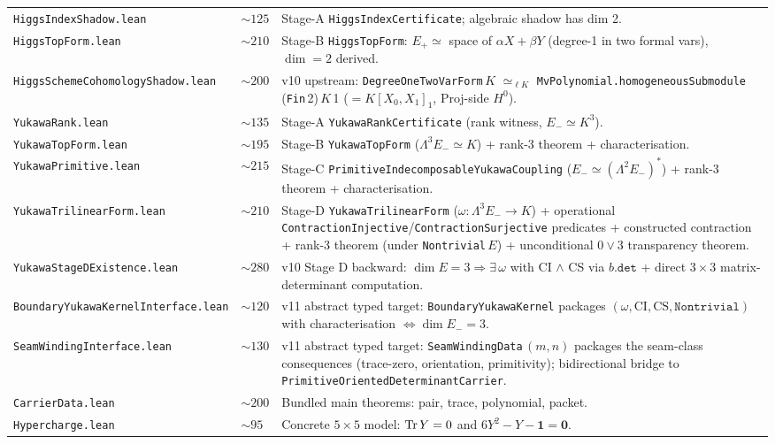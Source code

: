 \documentclass[11pt,a4paper]{article}
\begin{document}
\begin{center}
\begin{tabularx}{0.98\textwidth}{@{}p{}p{}Y@{}}
\texttt{HiggsIndexShadow.lean}    & $\sim125$ & Stage-A \texttt{HiggsIndexCertificate}; algebraic shadow has dim 2. \\
\texttt{HiggsTopForm.lean}        & $\sim210$ & Stage-B \texttt{HiggsTopForm}: $E_+ \simeq$ space of $\alpha X + \beta Y$ (degree-1 in two formal vars), $\dim = 2$ derived. \\
\texttt{HiggsSchemeCohomologyShadow.lean} & $\sim200$ & v10 upstream: \texttt{DegreeOneTwoVarForm}\,$K$ $\simeq_{\ell K}$ \texttt{MvPolynomial.homogeneousSubmodule}\,(\texttt{Fin}\,2)\,$K$\,1 ($= K[X_0, X_1]_1$, Proj-side $H^0$). \\
\texttt{YukawaRank.lean}          & $\sim135$ & Stage-A \texttt{YukawaRankCertificate} (rank witness, $E_- \simeq K^3$). \\
\texttt{YukawaTopForm.lean}       & $\sim195$ & Stage-B \texttt{YukawaTopForm} ($\Lambda^3 E_- \simeq K$) + rank-3 theorem + characterisation. \\
\texttt{YukawaPrimitive.lean}     & $\sim215$ & Stage-C \texttt{PrimitiveIndecomposableYukawaCoupling} ($E_- \simeq (\Lambda^2 E_-)^*$) + rank-3 theorem + characterisation. \\
\texttt{YukawaTrilinearForm.lean} & $\sim210$ & Stage-D \texttt{YukawaTrilinearForm} ($\omega : \Lambda^3 E_- \to K$) + operational \texttt{ContractionInjective}/\texttt{ContractionSurjective} predicates + constructed contraction + rank-3 theorem (under \texttt{Nontrivial}\,$E$) + unconditional $0\lor3$ transparency theorem. \\
\texttt{YukawaStageDExistence.lean}& $\sim280$ & v10 Stage D backward: $\dim E = 3 \Rightarrow \exists\,\omega$ with CI $\wedge$ CS via $b.\texttt{det}$ + direct $3\times 3$ matrix-determinant computation. \\
\texttt{BoundaryYukawaKernelInterface.lean}& $\sim120$ & v11 abstract typed target: \texttt{BoundaryYukawaKernel} packages $(\omega, \textrm{CI}, \textrm{CS}, \texttt{Nontrivial})$ with characterisation $\iff \dim E_- = 3$. \\
\texttt{SeamWindingInterface.lean}& $\sim130$ & v11 abstract typed target: \texttt{SeamWindingData}\,$(m, n)$ packages the seam-class consequences (trace-zero, orientation, primitivity); bidirectional bridge to \texttt{PrimitiveOrientedDeterminantCarrier}. \\
\texttt{CarrierData.lean}         & $\sim200$ & Bundled main theorems: pair, trace, polynomial, packet. \\
\texttt{Hypercharge.lean}         & $\sim95$  & Concrete $5\times5$ model: $\operatorname{Tr} Y=0$ and $6Y^2-Y-\mathbf 1 = \mathbf 0$. \\

\end{tabularx}
\end{center}
\end{document}
